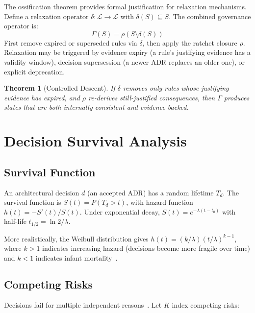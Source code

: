 \documentclass[11pt, a4paper, copyright]{googledeepmind}
\newtheorem{theorem}{Theorem}[section]
\begin{document}
The ossification theorem provides formal justification for relaxation mechanisms. Define a relaxation operator $\delta: \mathcal{L} \to \mathcal{L}$ with $\delta(S) \subseteq S$. The combined governance operator is:
\begin{equation}
    \Gamma(S) = \rho(S \setminus \delta(S))
\end{equation}
First remove expired or superseded rules via $\delta$, then apply the ratchet closure $\rho$. Relaxation may be triggered by evidence expiry (a rule's justifying evidence has a validity window), decision supersession (a newer ADR replaces an older one), or explicit deprecation.

\begin{theorem}[Controlled Descent]
If $\delta$ removes only rules whose justifying evidence has expired, and $\rho$ re-derives still-justified consequences, then $\Gamma$ produces states that are both internally consistent and evidence-backed.
\end{theorem}


\section{Decision Survival Analysis}
\label{sec:survival}

\subsection{Survival Function}

An architectural decision $d$ (an accepted ADR) has a random lifetime $T_d$. The survival function is $S(t) = P(T_d > t)$, with hazard function $h(t) = -S'(t)/S(t)$. Under exponential decay, $S(t) = e^{-\lambda(t - t_0)}$ with half-life $t_{1/2} = \ln 2 / \lambda$.

More realistically, the Weibull distribution gives $h(t) = (k/\lambda)(t/\lambda)^{k-1}$, where $k > 1$ indicates increasing hazard (decisions become more fragile over time) and $k < 1$ indicates infant mortality~\citep{herraiz2021}.

\subsection{Competing Risks}

Decisions fail for multiple independent reasons~\citep{fine1999, cox1972}. Let $K$ index competing risks:
\end{document}
